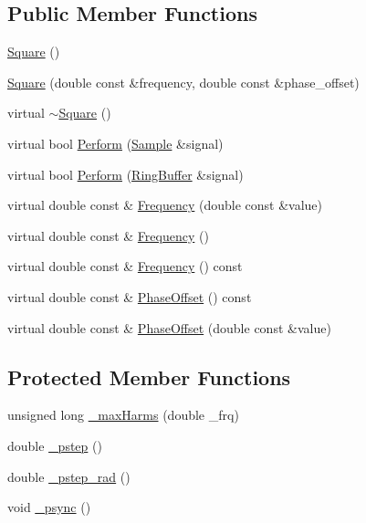 \subsection*{Public Member Functions}
\begin{DoxyCompactItemize}
\item 
\hyperlink{classSignal_1_1Fourier_1_1Square_ae9e86a649d8e70c793da8d69d0ac755b}{Square} ()
\item 
\hyperlink{classSignal_1_1Fourier_1_1Square_abe628eb3587a4eca934e8d449ef5ca3c}{Square} (double const \&frequency, double const \&phase\+\_\+offset)
\item 
virtual \hyperlink{classSignal_1_1Fourier_1_1Square_a2ad01bbdbb3ef7a252c2570f2574334e}{$\sim$\+Square} ()
\item 
virtual bool \hyperlink{classSignal_1_1Fourier_1_1Square_a29e4b9d03b9df4fb6ed0d7a817ecffda}{Perform} (\hyperlink{classSignal_1_1Sample}{Sample} \&signal)
\item 
virtual bool \hyperlink{classSignal_1_1Fourier_1_1Square_a7aacafda4427b996b56ad6764ea09177}{Perform} (\hyperlink{classSignal_1_1RingBuffer}{Ring\+Buffer} \&signal)
\item 
virtual double const \& \hyperlink{classSignal_1_1Fourier_1_1Square_a6d8ab67bf0dc5159772669396b1f6aa4}{Frequency} (double const \&value)
\item 
virtual double const \& \hyperlink{classSignal_1_1Fourier_1_1Square_adaad7d319e022fd12cdc9f0996502f04}{Frequency} ()
\item 
virtual double const \& \hyperlink{classSignal_1_1SignalGenerator_a96af42ee68f94e9b04d034fd68b73ecd}{Frequency} () const 
\item 
virtual double const \& \hyperlink{classSignal_1_1SignalGenerator_ac2538ec946f001e394d2416fda698d1c}{Phase\+Offset} () const 
\item 
virtual double const \& \hyperlink{classSignal_1_1SignalGenerator_ac6a103ff72beaa338f6d18c812522d78}{Phase\+Offset} (double const \&value)
\end{DoxyCompactItemize}
\subsection*{Protected Member Functions}
\begin{DoxyCompactItemize}
\item 
unsigned long \hyperlink{classSignal_1_1Fourier_1_1FourierGenerator_a99720416bd9ff96636f4acf956a785d5}{\+\_\+max\+Harms} (double \+\_\+frq)
\item 
double \hyperlink{classSignal_1_1SignalGenerator_a43b0eec84ee7df04c947533c0511c2c0}{\+\_\+pstep} ()
\item 
double \hyperlink{classSignal_1_1SignalGenerator_abf2f4ab977c6e84bf85022eab8135304}{\+\_\+pstep\+\_\+rad} ()
\item 
void \hyperlink{classSignal_1_1SignalGenerator_a563f57d4dfd8728a6a572f15c1e2532b}{\+\_\+psync} ()
\end{DoxyCompactItemize}
